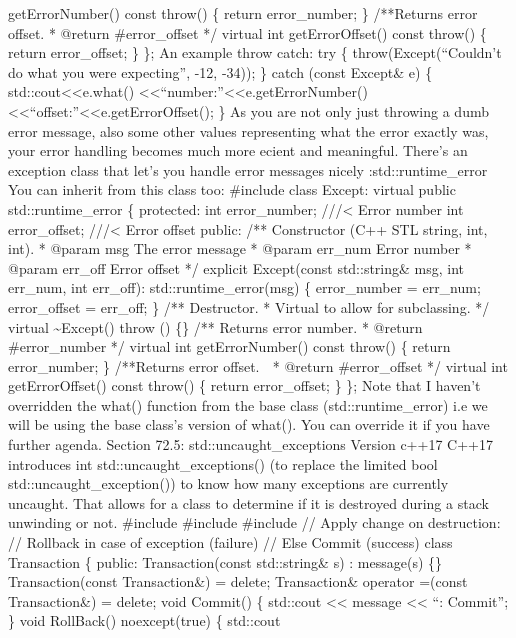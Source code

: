 getErrorNumber() const throw() \{ return error\_number; \} /**Returns
error offset. * @return \#error\_offset */ virtual int getErrorOffset()
const throw() \{  return error\_offset; \} \}; An example throw catch:
try \{ throw(Except(``Couldn't do what you were expecting'', -12, -34));
\} catch (const Except\& e) \{ std::cout\textless\textless e.what()
\textless\textless{}``\nError number:''\textless\textless e.getErrorNumber()
\textless\textless{}``\nError offset:''\textless\textless e.getErrorOffset();
\} As you are not only just throwing a dumb error message, also some
other values representing what the error exactly was, your error
handling becomes much more ecient and meaningful. There's an exception
class that let's you handle error messages nicely :std::runtime\_error
You can inherit from this class too: \#include class Except: virtual
public std::runtime\_error \{ protected: int error\_number;
///\textless{} Error number int error\_offset; ///\textless{} Error
offset public: /** Constructor (C++ STL string, int, int). * @param msg
The error message * @param err\_num Error number * @param err\_off Error
offset */ explicit Except(const std::string\& msg, int err\_num, int
err\_off): std::runtime\_error(msg) \{ error\_number = err\_num;
error\_offset = err\_off; \} /** Destructor. * Virtual to allow for
subclassing. */ virtual \textasciitilde Except() throw () \{\} /**
Returns error number. * @return \#error\_number */ virtual int
getErrorNumber() const throw() \{ return error\_number; \} /**Returns
error offset.  * @return \#error\_offset */ virtual int
getErrorOffset() const throw() \{ return error\_offset; \} \}; Note that
I haven't overridden the what() function from the base class
(std::runtime\_error) i.e we will be using the base class's version of
what(). You can override it if you have further agenda. Section 72.5:
std::uncaught\_exceptions Version c++17 C++17 introduces int
std::uncaught\_exceptions() (to replace the limited bool
std::uncaught\_exception()) to know how many exceptions are currently
uncaught. That allows for a class to determine if it is destroyed during
a stack unwinding or not. \#include \#include \#include // Apply change
on destruction: // Rollback in case of exception (failure) // Else
Commit (success) class Transaction \{ public: Transaction(const
std::string\& s) : message(s) \{\} Transaction(const Transaction\&) =
delete; Transaction\& operator =(const Transaction\&) = delete; void
Commit() \{ std::cout \textless\textless{} message \textless\textless{}
``: Commit\n''; \} void RollBack() noexcept(true) \{ std::cout
